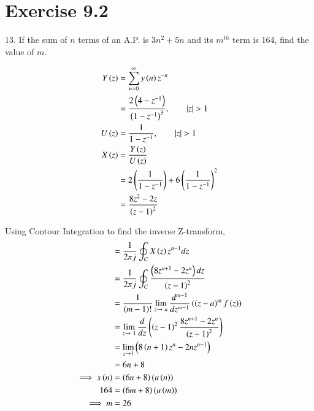 \documentclass[journal,12pt,twocolumn]{IEEEtran}
\begin{document}


\vspace{3cm}

\title{}
\author{EE23BTECH11054 -  Sai Krishna Shanigarapu$^{*}$
}
\maketitle
\newpage
\bigskip


\section*{Exercise 9.2}

13. \hspace{2pt}If the sum of $n$ terms of an A.P. is $3n^2+5n$ and its $m^{th}$ term is 164, find the value of $m$.
\bigskip

\solution

\begin{align}
Y\brak{z} &=  \sum_{n=0}^{\infty} y\brak{n}z^{-n} \\
&= \frac{2\brak{4-z^{-1}}}{\brak{1-z^{-1}}^3}, \qquad |z| > 1\\
U\brak{z} &= \frac{1}{1-z^{-1}}, \qquad |z| > 1\\
X\brak{z} &=  \frac{Y\brak{z}}{U\brak{z}}\\
 &= 2\left(\frac{1}{1-z^{-1}}\right) + 6\left(\frac{1}{1-z^{-1}}\right) ^2 \\
 &= \frac{8z^2 - 2z}{\brak{z-1}^2} %
\end{align}


Using Contour Integration to find the inverse Z-transform,
\begin{align}
    &= \frac{1}{2\pi j}\oint_C X\left(z\right)z^{n-1}dz\\
    &= \frac{1}{2\pi j}\oint_C \frac{\left(8z^{n+1} - 2z^{n}\right)dz}{\left(z-1\right)^2}\\
    &= \frac{1}{\left(m-1\right)!}\lim_{z\to\ a}\frac{d^{m-1}}{dz^{m-1}}\left(\left(z-a\right)^m f\left(z\right)\right)\\
    &= \lim_{z\to\ 1}\frac{d}{dz}\left(\left(z-1\right)^2 \frac{8z^{n+1} - 2z^n}{\left(z-1\right)^2}\right)\\
    &= \lim_{z\to 1}\left(8\left(n+1\right)z^n - 2nz^{n-1}\right)\\
    &= 6n+8\\
    \implies x\left(n\right) &= \left(6n+8\right)\left(u\left(n\right)\right)\\
    164 &= \left(6m+8\right)\left(u\left(m\right)\right)\\
    \implies m &= 26
\end{align}
\end{document}
